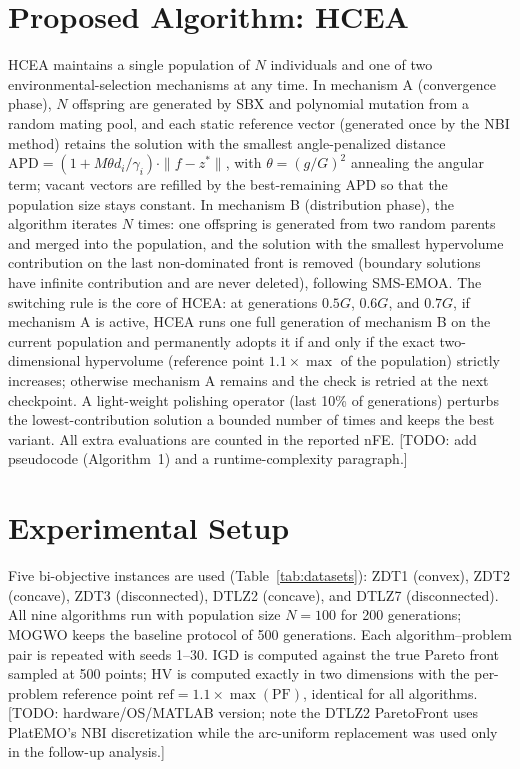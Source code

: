 \documentclass[journal]{IEEEtran}
\begin{document}
\section{Proposed Algorithm: HCEA}
HCEA maintains a single population of $N$ individuals and one of two environmental-selection mechanisms at any time. In mechanism A (convergence phase), $N$ offspring are generated by SBX and polynomial mutation from a random mating pool, and each static reference vector (generated once by the NBI method) retains the solution with the smallest angle-penalized distance $\mathrm{APD}=(1+M\theta d_i/\gamma_i)\cdot\|f-z^{\ast}\|$, with $\theta=(g/G)^{2}$ annealing the angular term; vacant vectors are refilled by the best-remaining APD so that the population size stays constant. In mechanism B (distribution phase), the algorithm iterates $N$ times: one offspring is generated from two random parents and merged into the population, and the solution with the smallest hypervolume contribution on the last non-dominated front is removed (boundary solutions have infinite contribution and are never deleted), following SMS-EMOA. The switching rule is the core of HCEA: at generations $0.5G$, $0.6G$, and $0.7G$, if mechanism A is active, HCEA runs one full generation of mechanism B on the current population and permanently adopts it if and only if the exact two-dimensional hypervolume (reference point $1.1\times\max$ of the population) strictly increases; otherwise mechanism A remains and the check is retried at the next checkpoint. A light-weight polishing operator (last 10\% of generations) perturbs the lowest-contribution solution a bounded number of times and keeps the best variant. All extra evaluations are counted in the reported nFE. [TODO: add pseudocode (Algorithm~1) and a runtime-complexity paragraph.]

\section{Experimental Setup}
Five bi-objective instances are used (Table~\ref{tab:datasets}): ZDT1 (convex), ZDT2 (concave), ZDT3 (disconnected), DTLZ2 (concave), and DTLZ7 (disconnected). All nine algorithms run with population size $N=100$ for 200 generations; MOGWO keeps the baseline protocol of 500 generations. Each algorithm--problem pair is repeated with seeds 1--30. IGD is computed against the true Pareto front sampled at 500 points; HV is computed exactly in two dimensions with the per-problem reference point $\mathrm{ref} = 1.1 \times \max(\mathrm{PF})$, identical for all algorithms. [TODO: hardware/OS/MATLAB version; note the DTLZ2 ParetoFront uses PlatEMO's NBI discretization while the arc-uniform replacement was used only in the follow-up analysis.]
\end{document}
